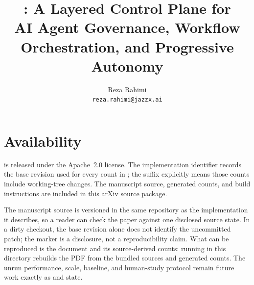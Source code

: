 \documentclass{article}
\title{\sysbare: A Layered Control Plane for\\AI Agent Governance, Workflow Orchestration, and Progressive Autonomy}
\author{%
  Reza Rahimi\\[0.4ex]
  \normalsize\texttt{reza.rahimi@jazzx.ai}%
}
\date{}
\renewcommand{\thesection}{\arabic{section}}
\providecommand{\statGitRev}{unknown}}
\begin{document}
\maketitle


















\section*{Availability}
\label{sec:availability}
\sys is released under the Apache~2.0 license. The implementation identifier
\code{\statGitRev} records the base revision used for every count in
; the  suffix explicitly means those counts include
working-tree changes. The manuscript source, generated counts, and build
instructions are included in this arXiv source package.

The manuscript source is versioned in the same repository as the implementation it
describes, so a reader can check the paper against one disclosed source state. In a
dirty checkout, the base revision alone does not identify the uncommitted patch;
the  marker is a disclosure, not a reproducibility claim.
What can be reproduced is the document and its source-derived counts: running
 in this directory rebuilds the PDF from the bundled sources and
generated counts. The unrun performance, scale, baseline, and human-study protocol
remain future work exactly as  and 
state.

{\small

}

\appendix
\renewcommand{\thesection}{\Alph{section}}




\end{document}
